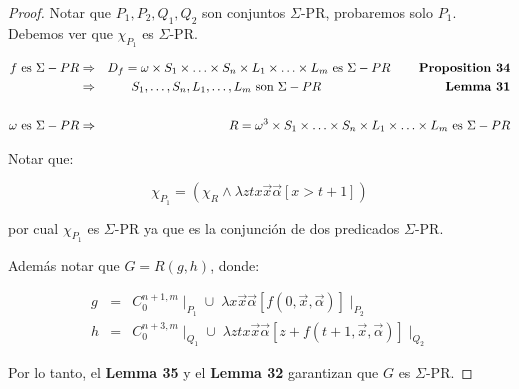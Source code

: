 \begin{proof}
    \par Notar que $P_{1}, P_{2}, Q_{1}, Q_{2}$ son conjuntos $\Sigma$-PR, probaremos solo $P_{1}$. Debemos ver que
    $\chi_{P_{1}}$ es $\Sigma$-PR.

    \begin{eqnarray}
      \nonumber f \text{ es } \Sigma-PR &\Rightarrow& D_{f} = \omega \times S_{1} \times \dotsc \times S_{n} \times
        L_{1} \times \dotsc \times L_{m} \text{ es } \Sigma-PR \qquad\; \text{\textbf{Proposition 34}} \\
      \nonumber &\Rightarrow& S_{1}, \dotsc, S_{n}, L_{1}, \dotsc, L_{m} \text{ son  } \Sigma-PR \qquad\qquad\qquad
        \qquad\qquad \text{\textbf{Lemma 31}} \\
      \nonumber \\
      \nonumber \omega \text{ es } \Sigma-PR &\Rightarrow& R = \omega^{3} \times S_{1} \times \dotsc \times S_{n}
        \times L_{1} \times \dotsc \times L_{m} \text{ es } \Sigma-PR
    \end{eqnarray}

    \par Notar que:

    \[
      \chi_{P_{1}} = (\chi_{R} \wedge \lambda ztx\vec{x} \vec{\alpha}\left[x > t+1\right])
    \]

    \par por cual $\chi_{P_{1}}$ es $\Sigma$-PR ya que es la conjunción de dos predicados $\Sigma$-PR.

    \par Además notar que $G = R(g, h)$, donde:

    \begin{eqnarray}
      \nonumber g &=& C_{0}^{n+1,m} \mid_{P_{1}} \cup \; \lambda x\vec{x}\vec{\alpha}\left[f(0,\vec{x}, \vec{\alpha})
        \right] \mid_{P_{2}} \\
      \nonumber h &=& C_{0}^{n+3,m} \mid_{Q_{1}} \cup \; \lambda ztx\vec{x}\vec{\alpha}\left[z+f(t+1,\vec{x},
        \vec{\alpha}) \right] \mid_{Q_{2}}
    \end{eqnarray}

    \par Por lo tanto, el \textbf{Lemma 35} y el \textbf{Lemma 32} garantizan que $G$ es $\Sigma$-PR.
  \end{proof}

